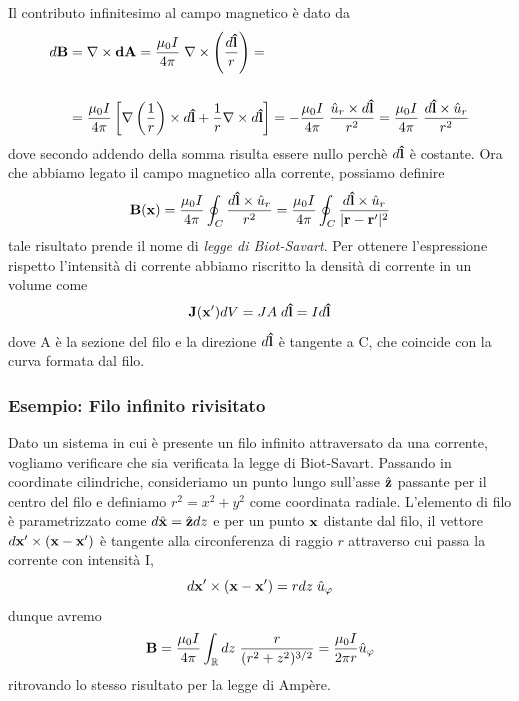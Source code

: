Il contributo infinitesimo al campo magnetico \`e dato da 
\begin{align*}
	d\bold{B} & = \nabla \times \bold{dA} = \frac{\mu_0I}{4 \pi } \; \nabla \times \left( \frac{d \bold{\hat{l}}}{r}\right)= \\[0.5cm]
	& = \frac{\mu_0 I}{4 \pi} \left [ \nabla \left( \frac{1}{r}\right) \times d\bold{\hat{l}} + \frac{1}{r} \nabla \times d\bold{\hat{l}}\right] = - \frac{\mu_0 I}{4 \pi} \; \frac{\hat{u}_{r} \times d\bold{\hat{l}}}{r^2} = \frac{\mu_0 I}{4 \pi} \; \frac{d \bold{\hat{l}} \times \hat{u}_r}{r^2}
\end{align*}
dove secondo addendo della somma risulta essere nullo perch\`e $d\bold{\hat{l}}$ \`e costante. Ora che abbiamo legato il campo magnetico alla corrente, possiamo definire 
\begin{equation}
	\bold{B}(\bold{x}) = \frac{\mu_0I}{4\pi} \oint_{C} \frac{d \bold{\hat{l}} \times \hat{u}_r}{r^2} = \frac{\mu_0I}{4\pi} \oint_{C} \frac{d \bold{\hat{l}} \times \hat{u}_r}{|\bold{r} -\bold{r}'|^2}
\end{equation}
tale risultato prende il nome di \textit{legge di Biot-Savart}. Per ottenere l'espressione rispetto l'intensit\`a di corrente abbiamo riscritto la densit\`a di corrente in un volume come 
\begin{equation*}
	\bold{J}(\bold{x}')dV = JA \;d\bold{\hat{l}} = Id\bold{\hat{l}}
\end{equation*}
dove A \`e la sezione del filo e la direzione $d \bold{\hat{l}}$ \`e tangente a C, che coincide con la curva formata dal filo.

\subsubsection{Esempio: Filo infinito rivisitato}

Dato un sistema in cui \`e presente un filo infinito attraversato da una corrente, vogliamo verificare che sia verificata la legge di Biot-Savart. Passando in coordinate cilindriche, consideriamo un punto lungo sull'asse $\hat{\bold{z}}$ passante per il centro del filo e definiamo $r^2 = x^2 + y^2$ come coordinata radiale. L'elemento di filo \`e parametrizzato come $d\hat{\bold{x}} = \hat{\bold{z}}dz$ e per un punto $\bold{x}$ distante dal filo, il vettore $d\bold{x}' \times (\bold{x}- \bold{x}')$ \`e tangente alla circonferenza di raggio $r$ attraverso cui passa la corrente con intensit\`a I,
\begin{equation*}
	d\bold{x}' \times (\bold{x} -\bold{x}') = r dz \;\hat{u}_{\varphi} 
\end{equation*}
dunque avremo 
\begin{equation*}
	\bold{B} = \frac{\mu_0I}{4\pi} \int_{\mathbb{R}} dz \; \frac{r}{(r^2+z^2)^{3/2}} = \frac{\mu_0I}{2 \pi r} \hat{u}_{\varphi}
\end{equation*}
ritrovando lo stesso risultato per la legge di Amp\`ere.

